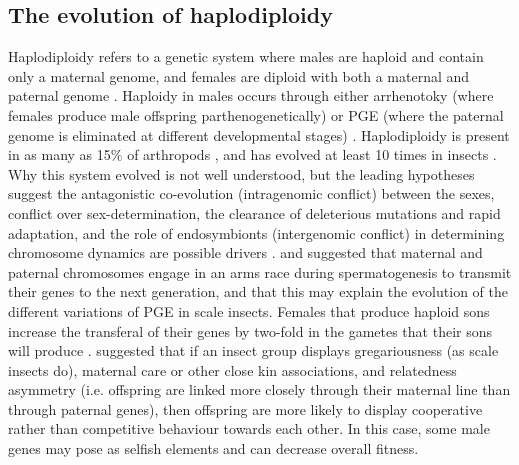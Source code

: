 \subsection{The evolution of haplodiploidy}
Haplodiploidy refers to a genetic system where males are haploid and contain only a maternal genome, and females are diploid with both a maternal and paternal genome \citep{Normark2004, DelaFilia2015}. Haploidy in males occurs through either arrhenotoky (where females produce male offspring parthenogenetically) or PGE (where the paternal genome is eliminated at different developmental stages) \citep{Bull1979, Burt2009, Ross2010GenomicSystems}.
Haplodiploidy is present in as many as 15\% of arthropods \citep{DelaFilia2015}, and has evolved at least 10 times in insects \citep{Normark2004, Normark2006}. Why this system evolved is not well understood, but the leading hypotheses suggest the antagonistic co-evolution (intragenomic conflict) between the sexes, conflict over sex-determination, the clearance of deleterious mutations and rapid adaptation, and the role of endosymbionts (intergenomic conflict) in determining chromosome dynamics are possible drivers \citep{Normark2004, Burt2009, Ross2010GenomicSystems, DelaFilia2015}. 
\citet{Bull1979} and \citet{Herrick1999} suggested that maternal and paternal chromosomes engage in an arms race during spermatogenesis to transmit their genes to the next generation, and that this may explain the evolution of the different variations of PGE in scale insects. Females that produce haploid sons increase the transferal of their genes by two-fold in the gametes that their sons will produce \citep{Bull1979}. \citet{Normark2006} suggested that if an insect group displays gregariousness (as scale insects do), maternal care or other close kin associations, and relatedness asymmetry (i.e. offspring are linked more closely through their maternal line than through paternal genes), then offspring are more likely to display cooperative rather than competitive behaviour towards each other. In this case, some male genes may pose as selfish elements and can decrease overall fitness. \\

